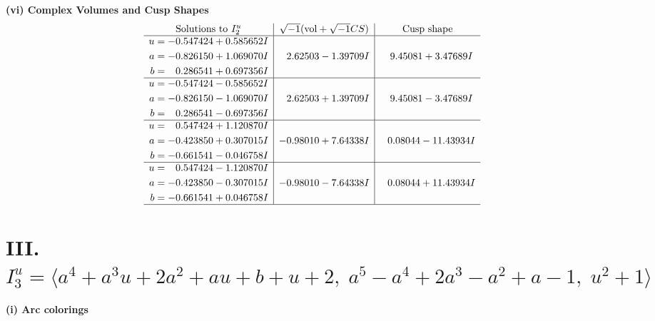 \documentclass[1p]{elsarticle_modified}
\theoremstyle{definition}
\newcommand{\I}{\sqrt{-1}}
\begin{document}
\newpage\flushleft \textbf{(vi) Complex Volumes and Cusp Shapes}
$$\begin{array}{c|c|c}  
\text{Solutions to }I^u_{2}& \I (\text{vol} + \sqrt{-1}CS) & \text{Cusp shape}\\
 \hline 
\begin{aligned}
u &= -0.547424 + 0.585652 I \\
a &= -0.826150 + 1.069070 I \\
b &= \phantom{-}0.286541 + 0.697356 I\end{aligned}
 & \phantom{-}2.62503 - 1.39709 I & \phantom{-}9.45081 + 3.47689 I \\ \hline\begin{aligned}
u &= -0.547424 - 0.585652 I \\
a &= -0.826150 - 1.069070 I \\
b &= \phantom{-}0.286541 - 0.697356 I\end{aligned}
 & \phantom{-}2.62503 + 1.39709 I & \phantom{-}9.45081 - 3.47689 I \\ \hline\begin{aligned}
u &= \phantom{-}0.547424 + 1.120870 I \\
a &= -0.423850 + 0.307015 I \\
b &= -0.661541 - 0.046758 I\end{aligned}
 & -0.98010 + 7.64338 I & \phantom{-}0.08044 - 11.43934 I \\ \hline\begin{aligned}
u &= \phantom{-}0.547424 - 1.120870 I \\
a &= -0.423850 - 0.307015 I \\
b &= -0.661541 + 0.046758 I\end{aligned}
 & -0.98010 - 7.64338 I & \phantom{-}0.08044 + 11.43934 I\\
 \hline 
 \end{array}$$\newpage\newpage\renewcommand{\arraystretch}{1}
\centering \section*{III. $I^u_{3}= \langle a^4+a^3 u+2 a^2+a u+b+u+2,\;a^5- a^4+2 a^3- a^2+a-1,\;u^2+1 \rangle$}
\flushleft \textbf{(i) Arc colorings}\\
\end{document}
